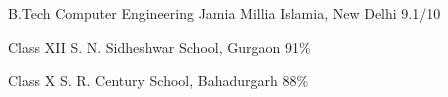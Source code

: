     {B.Tech}
    {Computer Engineering}
    {Jamia Millia Islamia, New Delhi}
    {9.1/10}
    {}

    {Class XII}
    {}
    {S. N. Sidheshwar School, Gurgaon}
    {91\%}
    {}

    {Class X}
    {}
    {S. R. Century School, Bahadurgarh}
    {88\%}
    {}
